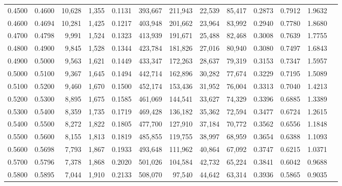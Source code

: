\begin{tabular}{rrrrrrrrrrrrr}
0.4500 & 0.4600 & 10,628 & 1,355 &                                     0.1131 & 393,667 & 211,943 &  22,539 &  85,417 & 0.2873 & 0.7912 & 1.9632 \\
0.4600 & 0.4694 & 10,281 & 1,425 &                                     0.1217 & 403,948 & 201,662 &  23,964 &  83,992 & 0.2940 & 0.7780 & 1.8680 \\
0.4700 & 0.4798 &  9,991 & 1,524 &                                     0.1323 & 413,939 & 191,671 &  25,488 &  82,468 & 0.3008 & 0.7639 & 1.7755 \\
0.4800 & 0.4900 &  9,845 & 1,528 &                                     0.1344 & 423,784 & 181,826 &  27,016 &  80,940 & 0.3080 & 0.7497 & 1.6843 \\
0.4900 & 0.5000 &  9,563 & 1,621 &                                     0.1449 & 433,347 & 172,263 &  28,637 &  79,319 & 0.3153 & 0.7347 & 1.5957 \\
0.5000 & 0.5100 &  9,367 & 1,645 &                                     0.1494 & 442,714 & 162,896 &  30,282 &  77,674 & 0.3229 & 0.7195 & 1.5089 \\
0.5100 & 0.5200 &  9,460 & 1,670 &                                     0.1500 & 452,174 & 153,436 &  31,952 &  76,004 & 0.3313 & 0.7040 & 1.4213 \\
0.5200 & 0.5300 &  8,895 & 1,675 &                                     0.1585 & 461,069 & 144,541 &  33,627 &  74,329 & 0.3396 & 0.6885 & 1.3389 \\
0.5300 & 0.5400 &  8,359 & 1,735 &                                     0.1719 & 469,428 & 136,182 &  35,362 &  72,594 & 0.3477 & 0.6724 & 1.2615 \\
0.5400 & 0.5500 &  8,272 & 1,822 &                                     0.1805 & 477,700 & 127,910 &  37,184 &  70,772 & 0.3562 & 0.6556 & 1.1848 \\
0.5500 & 0.5600 &  8,155 & 1,813 &                                     0.1819 & 485,855 & 119,755 &  38,997 &  68,959 & 0.3654 & 0.6388 & 1.1093 \\
0.5600 & 0.5698 &  7,793 & 1,867 &                                     0.1933 & 493,648 & 111,962 &  40,864 &  67,092 & 0.3747 & 0.6215 & 1.0371 \\
0.5700 & 0.5796 &  7,378 & 1,868 &                                     0.2020 & 501,026 & 104,584 &  42,732 &  65,224 & 0.3841 & 0.6042 & 0.9688 \\
0.5800 & 0.5895 &  7,044 & 1,910 &                                     0.2133 & 508,070 &  97,540 &  44,642 &  63,314 & 0.3936 & 0.5865 & 0.9035 \\

\end{tabular}
